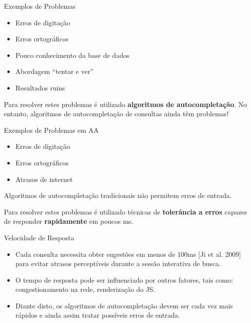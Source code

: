 \documentclass[11pt]{beamer}
\begin{document}
\begin{frame}[fragile]{Exemplos de Problemas}

    \begin{itemize}
        \item Erros de digitação
        \item Erros ortográficos
        \item Pouco conhecimento da base de dados
        \item Abordagem ``tentar e ver''
        \item Resultados ruins
    \end{itemize}
    \pause
    Para resolver estes problemas é utilizado \textbf{algoritmos de autocompletação}. No entanto, algoritmos de autocompletação de consultas ainda têm problemas!
    
\end{frame}

\begin{frame}[fragile]{Exemplos de Problemas em AA}
    
    \begin{itemize}
        \item Erros de digitação
        \item Erros ortográficos
        \item Atrasos de internet
    \end{itemize}
    
    Algoritmos de autocompletação tradicionais não permitem erros de entrada.
    
    \pause
    Para resolver estes problemas é utilizado técnicas de \textbf{tolerância a erros} capazes de responder \textbf{rapidamente} em poucos ms.

\end{frame}

\begin{frame}{Velocidade de Resposta}
    \begin{itemize}
        \justifying
        \item Cada consulta necessita obter sugestões em menos de 100ms [Ji et al. 2009] para evitar atrasos perceptíveis durante a sessão interativa de busca. \pause
        \item O tempo de resposta pode ser influenciado por outros fatores, tais como: congestionamento na rede, renderização do JS. \pause
        \item Diante disto, os algoritmos de autocompletação devem ser cada vez mais rápidos e ainda assim tratar possíveis erros de entrada.
    \end{itemize}

\end{frame}
\end{document}
